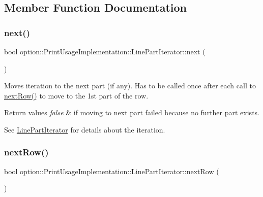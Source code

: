 \subsection{Member Function Documentation}
\mbox{\label{classoption_1_1_print_usage_implementation_1_1_line_part_iterator_a58b8743da57de2d108472eee60324df6}} 
\subsubsection{\texorpdfstring{next()}{next()}}
{\footnotesize\ttfamily bool option\+::\+Print\+Usage\+Implementation\+::\+Line\+Part\+Iterator\+::next (\begin{DoxyParamCaption}{ }\end{DoxyParamCaption})\hspace{0.3cm}{\ttfamily [inline]}}



Moves iteration to the next part (if any). Has to be called once after each call to \hyperlink{classoption_1_1_print_usage_implementation_1_1_line_part_iterator_a55d5c3e50f9c1d8cd48f518899a5a48c}{next\+Row()} to move to the 1st part of the row. 


\begin{DoxyRetVals}{Return values}
{\em false} & if moving to next part failed because no further part exists.\\
\hline
\end{DoxyRetVals}
See \hyperlink{classoption_1_1_print_usage_implementation_1_1_line_part_iterator}{Line\+Part\+Iterator} for details about the iteration. \mbox{\label{classoption_1_1_print_usage_implementation_1_1_line_part_iterator_a55d5c3e50f9c1d8cd48f518899a5a48c}} 
\subsubsection{\texorpdfstring{next\+Row()}{nextRow()}}
{\footnotesize\ttfamily bool option\+::\+Print\+Usage\+Implementation\+::\+Line\+Part\+Iterator\+::next\+Row (\begin{DoxyParamCaption}{ }\end{DoxyParamCaption})\hspace{0.3cm}{\ttfamily [inline]}}



